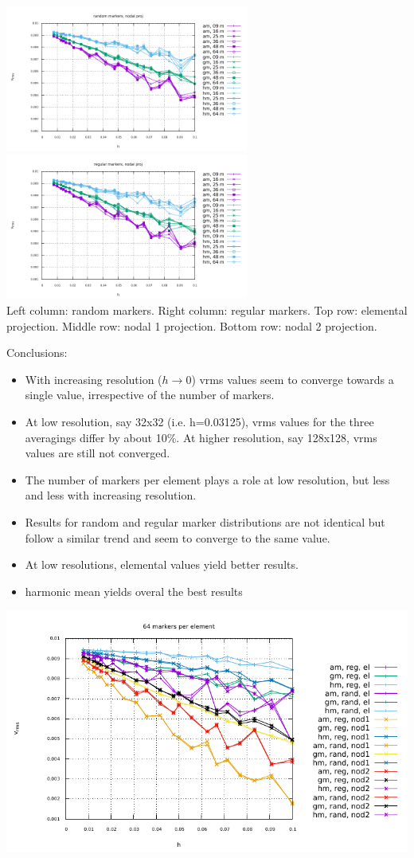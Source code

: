 \begin{center}
\includegraphics[width=8cm]{python_codes/fieldstone_13/vrms_rand_proj3} 
\includegraphics[width=8cm]{python_codes/fieldstone_13/vrms_norand_proj3}\\
Left column: random markers. Right column: regular markers.
Top row: elemental projection. Middle row: nodal 1 projection. Bottom row: nodal 2 projection. 
\end{center}

Conclusions:
\begin{itemize}
\item
With increasing resolution ($h\rightarrow 0$) vrms values seem to converge towards a single value, irrespective 
of the number of markers. 

\item
At low resolution, say 32x32 (i.e. h=0.03125), vrms values for the three averagings differ by about 10\%. At higher resolution, say 128x128, vrms values are still not converged.  

\item
The number of markers per element plays a role at low resolution, but less and less with increasing resolution. 

\item
Results for random and regular marker distributions are not identical but follow a similar trend and seem to converge to 
the same value.

\item
At low resolutions, elemental values yield better results.

\item harmonic mean yields overal the best results
\end{itemize}

\includegraphics[width=15cm]{python_codes/fieldstone_13/vrms} 
